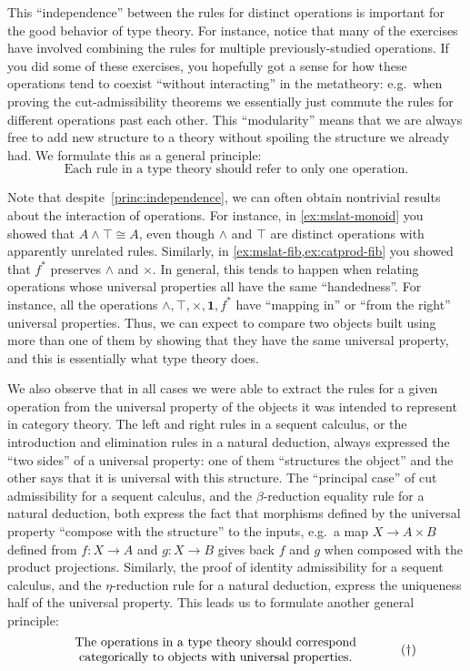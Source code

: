 \documentclass{book}
\let\meet\wedge
\def\unit{\mathbf{1}}
\begin{document}
This ``independence'' between the rules for distinct operations is important for the good behavior of type theory.
For instance, notice that many of the exercises have involved combining the rules for multiple previously-studied operations.
If you did some of these exercises, you hopefully got a sense for how these operations tend to coexist ``without interacting'' in the metatheory: e.g.\
when proving the cut-admissibility theorems we essentially just commute the rules for different operations past each other.
This ``modularity'' means that we are always free to add new structure to a theory without spoiling the structure we already had.
We formulate this as a general principle:
\begin{equation}\label{princ:independence}
  \text{Each rule in a type theory should refer to only one operation}.\tag{$\ast$}
\end{equation}

Note that despite~\eqref{princ:independence}, we can often obtain nontrivial results about the interaction of operations.
For instance, in \cref{ex:mslat-monoid} you showed that $A\meet \top\cong A$, even though $\meet$ and $\top$ are distinct operations with apparently unrelated rules.
Similarly, in \cref{ex:mslat-fib,ex:catprod-fib} you showed that $f^*$ preserves $\meet$ and $\times$.
In general, this tends to happen when relating operations whose universal properties all have the same ``handedness''.
For instance, all the operations $\meet,\top,\times,\unit,f^*$ have ``mapping in'' or ``from the right'' universal properties.
Thus, we can expect to compare two objects built using more than one of them by showing that they have the same universal property, and this is essentially what type theory does.

We also observe that in all cases we were able to extract the rules for a given operation from the universal property of the objects it was intended to represent in category theory.
The left and right rules in a sequent calculus, or the introduction and elimination rules in a natural deduction, always expressed the ``two sides'' of a universal property: one of them ``structures the object'' and the other says that it is universal with this structure.
The ``principal case'' of cut admissibility for a sequent calculus, and the $\beta$-reduction equality rule for a natural deduction, both express the fact that morphisms defined by the universal property ``compose with the structure'' to the inputs, e.g.\ a map $X\to A\times B$ defined from $f:X\to A$ and $g:X\to B$ gives back $f$ and $g$ when composed with the product projections.
Similarly, the proof of identity admissibility for a sequent calculus, and the $\eta$-reduction rule for a natural deduction, express the uniqueness half of the universal property.
This leads us to formulate another general principle:
\begin{equation}\label{princ:ump}
  \parbox{3.5in}{\centering The operations in a type theory should correspond categorically to objects with universal properties.}\tag{$\dagger$}
\end{equation}
\end{document}
